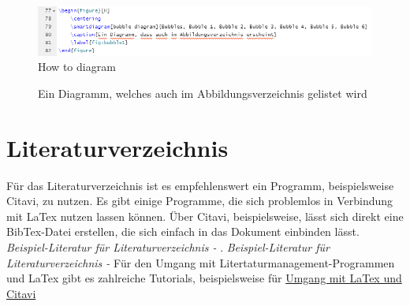 \begin{figure}
    \centering
    \includegraphics[width=\textwidth]{03_GraphicFiles/smartdiagram.PNG}
    \caption{How to diagram}
    \label{fig:diagrams}
\end{figure}

\begin{figure}[H]
    \centering
    \caption{Ein Diagramm, welches auch im Abbildungsverzeichnis gelistet wird}
    \label{fig:bubble1}
\end{figure}

\section{Literaturverzeichnis}
Für das Literaturverzeichnis ist es empfehlenswert ein Programm, beispielsweise Citavi, zu nutzen. Es gibt einige Programme, die sich problemlos in Verbindung mit LaTex nutzen lassen können. Über Citavi, beispielsweise, lässt sich direkt eine BibTex-Datei erstellen, die sich einfach in das Dokument einbinden lässt. \emph{Beispiel-Literatur für Literaturverzeichnis -} \cite{Butterworth1992}.
\emph{Beispiel-Literatur für Literaturverzeichnis -} \cite{Clark1976}
Für den Umgang mit Litertaturmanagement-Programmen und LaTex gibt es zahlreiche Tutorials, beispielsweise für  \href{https://www.youtube.com/watch?v=GmyCcvXrSDI}{Umgang mit LaTex und Citavi}




